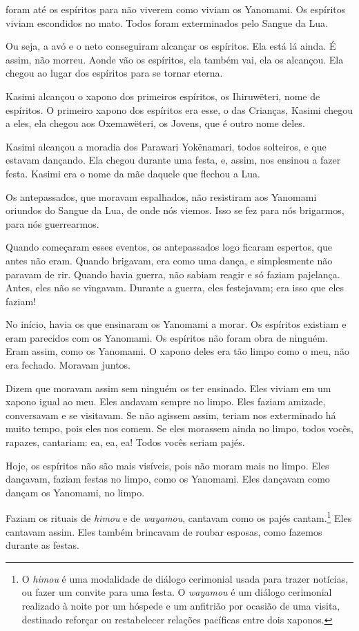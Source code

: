  

 foram até os espíritos para não viverem como viviam
os {Yanomami}. Os espíritos viviam escondidos no mato. Todos foram
exterminados pelo Sangue da Lua.

Ou seja, a avó e o neto conseguiram alcançar os espíritos. Ela está lá ainda. É assim, não morreu. Aonde vão os espíritos, ela também vai, ela os
alcançou. Ela chegou ao lugar dos espíritos para se tornar eterna. 

Kasimi alcançou o xapono dos primeiros espíritos, os Ihiruwëteri, nome
de espíritos. O primeiro xapono dos espíritos era esse, o das
Crianças, Kasimi chegou a eles, ela chegou aos
Oxemawëteri, os Jovens, que é outro nome deles. 

Kasimi alcançou a moradia dos Parawari Yokënamari, todos solteiros, e que
estavam dançando. Ela chegou durante uma festa, e, assim, nos ensinou a
fazer festa. Kasimi era o nome da mãe daquele que flechou a Lua.

Os antepassados, que moravam espalhados, não resistiram aos Yanomami
oriundos do Sangue da Lua, de onde nós viemos. Isso se fez para nós
brigarmos, para nós guerrearmos. 

Quando começaram esses eventos, os antepassados logo ficaram espertos,
que antes não eram. Quando brigavam, era como uma dança, e
simplesmente não paravam de rir. Quando havia guerra, não sabiam reagir
e {só} faziam pajelança. Antes, eles não se vingavam.
Durante a guerra, eles festejavam; era isso que eles faziam! 

No início, havia os que ensinaram os Yanomami a morar. Os espíritos
existiam e eram parecidos com os Yanomami. Os espíritos não foram obra
de ninguém. Eram assim, como os Yanomami. O xapono deles era tão limpo
como o meu, não era fechado. Moravam juntos. 

Dizem que moravam assim sem ninguém os ter ensinado. Eles viviam em um xapono
igual ao meu. Eles andavam sempre no limpo. Eles faziam amizade,
conversavam e se visitavam. Se não agissem assim, teriam nos exterminado
há muito tempo, pois eles nos comem. Se eles morassem ainda no limpo,
todos vocês, rapazes, cantariam: ea, ea, ea! Todos vocês seriam
pajés. 

Hoje, os espíritos não são mais visíveis, pois não moram mais no limpo.
Eles dançavam, faziam festas no limpo, como os Yanomami. Eles dançavam
como dançam os Yanomami, no limpo. 

Faziam os rituais de \emph{himou} e de \emph{wayamou}, cantavam como os
pajés cantam.\footnote{  O \emph{himou} é uma modalidade de diálogo cerimonial usada para trazer notícias, ou fazer um convite para uma festa. O \emph{wayamou} é um diálogo cerimonial realizado à noite por um hóspede e um anfitrião por ocasião de uma visita, destinado reforçar ou restabelecer relações pacíficas entre dois xaponos.}  Eles cantavam assim. Eles também brincavam de roubar
esposas, como fazemos durante as festas. 

